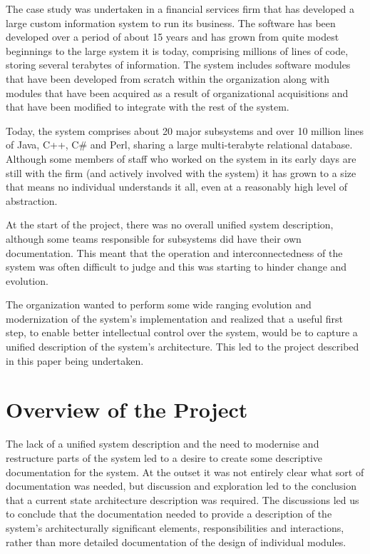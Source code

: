   The case study was undertaken in a financial services firm that has developed a large custom information system to run its business.  The software has been developed over a period of about 15 years and has grown from quite modest beginnings to the large system it is today, comprising millions of lines of code, storing several terabytes of information.  The system includes software modules that have been developed from scratch within the organization along with modules that have been acquired as a result of organizational acquisitions and that have been modified to integrate with the rest of the system.

  Today, the system comprises about 20 major subsystems and over 10 million lines of Java, C++, C\# and Perl, sharing a large multi-terabyte relational database.  Although some members of staff who worked on the system in its early days are still with the firm (and actively involved with the system) it has grown to a size that means no individual understands it all, even at a reasonably high level of abstraction.

  At the start of the project, there was no overall unified system description, although some teams responsible for subsystems did have their own documentation. This meant that the operation and interconnectedness of the system was often difficult to judge and this was starting to hinder change and evolution.

  The organization wanted to perform some wide ranging evolution and modernization of the system's implementation and realized that a useful first step, to enable better intellectual control over the system, would be to capture a unified description of the system's architecture.  This led to the project described in this paper being undertaken.

\section{Overview of the Project}
\label{sec:overview}

  The lack of a unified system description and the need to modernise and restructure parts of the system led to a desire to create some descriptive documentation for the system.  At the outset it was not entirely clear what sort of documentation was needed, but discussion and exploration led to the conclusion that a current state architecture description was required.  The discussions led us to conclude that the documentation needed to provide a description of the system's architecturally significant elements, responsibilities and interactions, rather than more detailed documentation of the design of individual modules.

